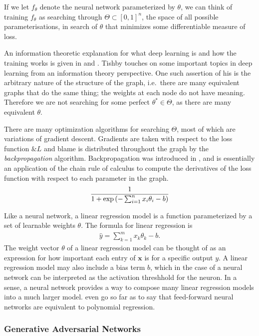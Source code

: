 If we let $f_\theta$ denote the neural network parameterized by
$\theta$, we can think of training $f_\theta$ as searching through
$\Theta \subset [0, 1]^n$, the space of all possible
parameterisations, in search of $\theta$ that minimizes some
differentiable measure of loss.

An information theoretic explanation for what deep learning is and how
the training works is given in \cite{ref:tishby-2015} and
\cite{ref:tishby-2017}. Tishby touches on some important topics in
deep learning from an information theory perspective.  One such
assertion of his is the arbitrary nature of the structure of the
graph, i.e.\ there are many equivalent graphs that do the same thing;
the weights at each node do not have meaning. Therefore we are not
searching for some perfect $\theta^* \in \Theta$, as there are many
equivalent $\theta$.

There are many optimization algorithms for searching $\Theta$, most of
which are variations of gradient descent. Gradients are taken with
respect to the loss function $\&L$ and blame is distributed throughout
the graph by the \textit{backpropagation} algorithm. Backpropagation
was introduced in \cite{ref:rumelhart-1986}, and is essentially an
application of the chain rule of calculus to compute the derivatives
of the loss function with respect to each parameter in the graph.
\begin{align}
{1 \over 1 + \exp{(- \sum_{i = 1}^n x_i\theta_i - b )}}
\end{align}

Like a neural network, a linear regression model is a function
parameterized by a set of learnable weights $\theta$. The formula for
linear regression is
\begin{align}
  \label{eq:lin-reg} \hat{y} = \sum_{k=1}^m x_k\theta_k - b.
\end{align} The weight vector $\theta$ of a linear regression model
can be thought of as an expression for how important each entry of
$\mathbf{x}$ is for a specific output $y$. A linear regression model
may also include a bias term $b$, which in the case of a neural
network can be interpreted as the activation threshhold for the
neuron. In a sense, a neural network provides a way to compose many
linear regression models into a much larger
model. \cite{ref:cheng-2018} even go so far as to say that
feed-forward neural networks are equivalent to polynomial regression.

\subsubsection*{Generative Adversarial Networks}

